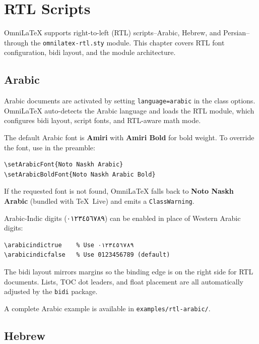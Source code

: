 \chapter{RTL Scripts}
\label{ch:rtl}

OmniLaTeX supports right-to-left (RTL) scripts--Arabic, Hebrew, and
Persian--through the \texttt{omnilatex-rtl.sty} module.  This chapter
covers RTL font configuration, bidi layout, and the module architecture.

\section{Arabic}

Arabic documents are activated by setting \texttt{language=arabic} in the
class options.  OmniLaTeX auto-detects the Arabic language and loads the
RTL module, which configures bidi layout, script fonts, and RTL-aware
math mode.

The default Arabic font is \textbf{Amiri} with \textbf{Amiri Bold} for
bold weight.  To override the font, use  in the preamble:

\begin{verbatim}
\setArabicFont{Noto Naskh Arabic}
\setArabicBoldFont{Noto Naskh Arabic Bold}
\end{verbatim}

If the requested font is not found, OmniLaTeX falls back to
\textbf{Noto Naskh Arabic} (bundled with \TeX\ Live) and emits a
\texttt{ClassWarning}.

Arabic-Indic digits (٠١٢٣٤٥٦٧٨٩) can be enabled in place of Western
Arabic digits:

\begin{verbatim}
\arabicindictrue    % Use ٠١٢٣٤٥٦٧٨٩
\arabicindicfalse   % Use 0123456789 (default)
\end{verbatim}

The bidi layout mirrors margins so the binding edge is on the right side
for RTL documents.  Lists, TOC dot leaders, and float placement are all
automatically adjusted by the \texttt{bidi} package.

A complete Arabic example is available in \texttt{examples/rtl-arabic/}.

\section{Hebrew}

